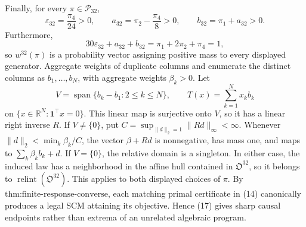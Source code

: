 Finally, for every \(\pi\in\mathcal P_{32}\),
\[
\varepsilon_{32}=\frac{\pi_4}{24}>0,
\qquad
a_{32}=\pi_2-\frac{\pi_4}{8}>0,
\qquad
b_{32}=\pi_1+a_{32}>0.
\tag{18}
\]
Furthermore,
\[
30\varepsilon_{32}+a_{32}+b_{32}=\pi_1+2\pi_2+\pi_4=1,
\]
so \(w^{32}(\pi)\) is a probability vector assigning positive mass to every displayed generator.  Aggregate weights of duplicate columns and enumerate the distinct columns as \(b_1,\ldots,b_N\), with aggregate weights \(\beta_k>0\).  Let
\[
V=\operatorname{span}\{b_k-b_1:2\leq k\leq N\},
\qquad
T(x)=\sum_{k=1}^Nx_kb_k
\]
on \(\{x\in\mathbb R^N:\mathbf 1^{\top}x=0\}\).  This linear map is surjective onto \(V\), so it has a linear right inverse \(R\).  If \(V\neq\{0\}\), put \(C=\sup_{\|d\|_2=1}\|Rd\|_\infty<\infty\).  Whenever \(\|d\|_2<\min_k\beta_k/C\), the vector \(\beta+Rd\) is nonnegative, has mass one, and maps to \(\sum_k\beta_kb_k+d\).  If \(V=\{0\}\), the relative domain is a singleton.  In either case, the induced law has a neighborhood in the affine hull contained in \(\mathfrak O^{32}\), so it belongs to \(\operatorname{relint}(\mathfrak O^{32})\).  This applies to both displayed choices of \(\pi\).  By \(\text{thm:finite-response-converse}\), each matching primal certificate in (14) canonically produces a legal SCM attaining its objective.  Hence (17) gives sharp causal endpoints rather than extrema of an unrelated algebraic program.